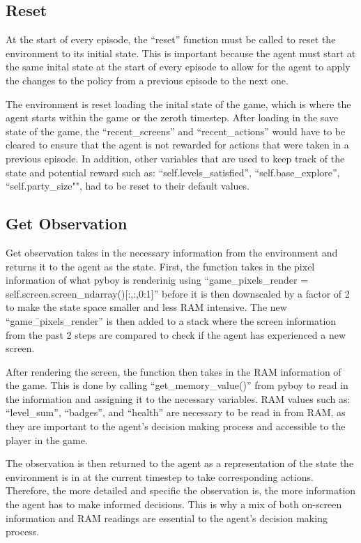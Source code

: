 \subsection{Reset}

At the start of every episode, the ``reset'' function must be called to reset the environment to its initial state. This is important because the agent must start at the same inital state at the start of every episode to allow for the agent to apply the changes to the policy from a previous episode to the next one. 

The environment is reset loading the inital state of the game, which is where the agent starts within the game or the zeroth timestep. After loading in the save state of the game, the ``recent\_screens'' and ``recent\_actions'' would have to be cleared to ensure that the agent is not rewarded for actions that were taken in a previous episode. In addition, other variables that are used to keep track of the state and potential reward such as: ``self.levels\_satisfied'', ``self.base\_explore'', ``self.party\_size"", had to be reset to their default values. 

\subsection{Get Observation}

Get observation takes in the necessary information from the environment and returns it to the agent as the state. First, the function takes in the pixel information of what pyboy is renderinig using ``game\_pixels\_render = self.screen.screen\_ndarray()[:,:,0:1]'' before it is then downscaled by a factor of 2 to make the state space smaller and less RAM intensive. The new ``game\=\_pixels\_render'' is then added to a stack where the screen information from the past 2 steps are compared to check if the agent has experienced a new screen.

After rendering the screen, the function then takes in the RAM information of the game. This is done by calling ``get\_memory\_value()'' from pyboy to read in the information and assigning it to the necessary variables. RAM values such as: ``level\_sum'', ``badges'', and ``health'' are necessary to be read in from RAM, as they are important to the agent's decision making process and accessible to the player in the game. 

The observation is then returned to the agent as a representation of the state the environment is in at the current timestep to take corresponding actions. Therefore, the more detailed and specific the observation is, the more information the agent has to make informed decisions. This is why a mix of both on-screen information and RAM readings are essential to the agent's decision making process. 

